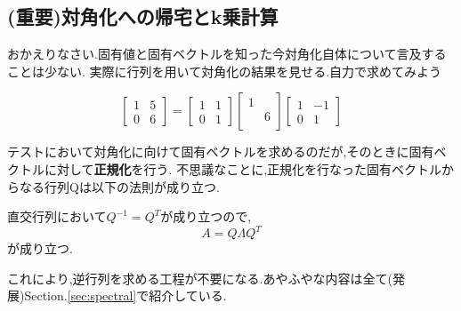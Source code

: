 \subsection{(重要)対角化への帰宅とk乗計算}
おかえりなさい.固有値と固有ベクトルを知った今対角化自体について言及することは少ない.
実際に行列を用いて対角化の結果を見せる.自力で求めてみよう
\begin{framed}
\[
    \begin{bmatrix}
        1 & 5 \\ 0 & 6
    \end{bmatrix}=
    \begin{bmatrix}
        1 & 1 \\ 0 & 1
    \end{bmatrix}
    \begin{bmatrix}
        1 & \\ & 6\\
    \end{bmatrix}
    \begin{bmatrix}
        1 & -1  \\ 0 & 1
    \end{bmatrix}
\]
\end{framed}

テストにおいて対角化に向けて固有ベクトルを求めるのだが,そのときに固有ベクトルに対して\textbf{正規化}を行う.
不思議なことに,正規化を行なった固有ベクトルからなる行列Qは以下の法則が成り立つ.
\begin{tcolorbox}[colframe=black!80,colback=white,title=直交行列Qと対角化]
    直交行列において$Q^{-1}=Q^T$が成り立つので,
\[
    A = Q\Lambda Q^T 
\]
が成り立つ.
\end{tcolorbox}
これにより,逆行列を求める工程が不要になる.あやふやな内容は全て(発展)Section.\ref{sec:spectral}で紹介している.\bigskip\\

